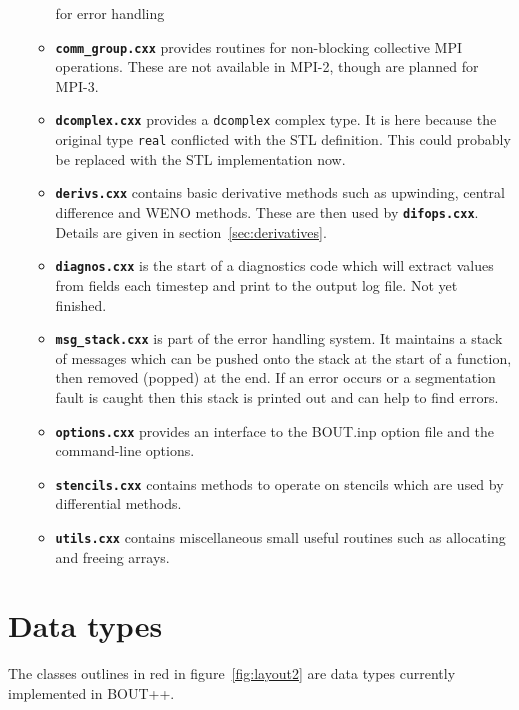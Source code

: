 \documentclass[12pt]{article}
\newcommand{\code}[1]{\texttt{#1}}
\newcommand{\file}[1]{\texttt{\bf #1}}
\begin{document}
\begin{itemize}
\begin{itemize}
    for error handling
  \item \file{comm\_group.cxx} provides routines for non-blocking collective 
    MPI operations. These are not available in MPI-2, though are planned for
    MPI-3.
  \item \file{dcomplex.cxx} provides a \code{dcomplex} complex type. It is here
    because the original type \code{real} conflicted with the STL definition.
    This could probably be replaced with the STL implementation now.
  \item \file{derivs.cxx} contains basic derivative methods such as
    upwinding, central difference and WENO methods. These are then
    used by \file{difops.cxx}. Details are given in
    section~\ref{sec:derivatives}.
  \item \file{diagnos.cxx} is the start of a diagnostics code which will extract
    values from fields each timestep and print to the output log file. Not
    yet finished.
  \item \file{msg\_stack.cxx} is part of the error handling system. It maintains
    a stack of messages which can be pushed onto the stack at the start of 
    a function, then removed (popped) at the end. If an error occurs or 
    a segmentation fault is caught then this stack is printed out and can
    help to find errors.
  \item \file{options.cxx} provides an interface to the BOUT.inp option file
    and the command-line options. 
  \item \file{stencils.cxx} contains methods to operate on stencils which are
    used by differential methods. 
  \item \file{utils.cxx} contains miscellaneous small useful routines
    such as allocating and freeing arrays.
  \end{itemize}
\end{itemize}



\section{Data types}

The classes outlines in red in figure~\ref{fig:layout2} are data types 
currently implemented in BOUT++. 
\end{document}
